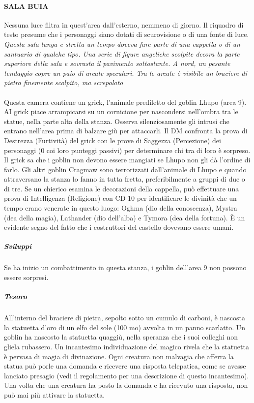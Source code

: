 \documentclass{article}
\begin{document}
\paragraph{SALA BUIA}
Nessuna luce filtra in quest'area dall’esterno, nemmeno di
giorno. Il riquadro di testo presume che i personaggi siano
dotati di scurovisione o di una fonte di luce.\\
\textit{Questa sala lunga e stretta un tempo doveva fare parte di
una cappella o di un santuario di qualche tipo. Una serie
di figure angeliche scolpite decora la parte superiore della
sala e sovrasta il pavimento sottostante. A nord, un pesante
tendaggio copre un paio di arcate speculari. Tra le arcate è
visibile un braciere di pietra finemente scolpito, ma screpolato}\\
\\
Questa camera contiene un grick, l’animale prediletto del
goblin Lhupo (area 9). AI grick piace arrampicarsi su un
cornicione per nascondersi nell’ombra tra le statue, nella
parte alta della stanza. Osserva silenziosamente gli intrusi
che entrano nell’area prima di balzare giù per attaccarli. Il
DM confronta la prova di Destrezza (Furtività) del grick con
le prove di Saggezza (Percezione) dei personaggi (0 coi loro
punteggi passivi) per determinare chi tra di loro è sorpreso.
Il grick sa che i goblin non devono essere mangiati se Lhupo
non gli dà l'ordine di farlo. Gli altri goblin Cragmaw sono
terrorizzati dall’animale di Lhupo e quando attraversano la
stanza lo fanno in tutta fretta, preferibilmente a gruppi di
due o di tre.
Se un chierico esamina le decorazioni della cappella, può
effettuare una prova di Intelligenza (Religione) con CD 10
per identificare le divinità che un tempo erano venerate in
questo luogo: Oghma (dio della conoscenza), Mystra (dea della
magia), Lathander (dio dell'alba) e Tymora (dea della fortuna).
È un evidente segno del fatto che i costruttori del castello
dovevano essere umani.\\

\subparagraph{Sviluppi}
Se ha inizio un combattimento in questa stanza, i goblin
dell’area 9 non possono essere sorpresi.

\subparagraph{Tesoro}
All’interno del braciere di pietra, sepolto sotto un cumulo di
carboni, è nascosta la statuetta d’oro di un elfo del sole (100
mo) avvolta in un panno scarlatto. Un goblin ha nascosto
la statuetta quaggiù, nella speranza che i suoi colleghi non
gliela rubassero.
Un incantesimo individuazione del magico rivela che la
statuetta è pervasa di magia di divinazione. Ogni creatura
non malvagia che afferra la statua può porle una domanda
e ricevere una risposta telepatica, come se avesse lanciato
presagio (vedi il regolamento per una descrizione di questo
incantesimo). Una volta che una creatura ha posto la
domanda e ha ricevuto una risposta, non può mai più attivare
la statuetta.










    
\end{document}
